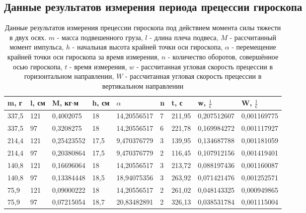\documentclass[12pt]{article}
\begin{document}
\subsection{Данные результатов измерения периода прецессии гироскопа} \label{app_2}
\begin{table}[H]
    \centering
    \begin{tabular}{|l|l|l|l|l|l|l|l|l|}
        \hline
        m, г  & l, см & M, кг$\cdot$м & h, см & $\alpha$    & n & t, с   & w, $\frac{1}{\textrm{с}}$ & W, $\frac{1}{\textrm{с}}$ \\ 
        \hline
        337,5 & 121   & 0,4002075     & 18    & 14,20556517 & 7 & 211,95 & 0,207512607               & 0,001169775               \\
        337,5 & 97    & 0,3208275     & 18    & 14,20556517 & 6 & 221,78 & 0,169984272               & 0,001117927               \\ 
        214,4 & 121   & 0,25423552    & 17,5  & 9,470376779 & 3 & 139,95 & 0,134687788               & 0,001181059               \\
        214,4 & 97    & 0,20380864    & 17,5  & 9,470376779 & 2 & 116,45 & 0,107912156               & 0,001419401               \\ 
        140,8 & 121   & 0,16696064    & 18    & 14,20556517 & 3 & 213,72 & 0,088197436               & 0,001160087               \\ 
        140,8 & 97    & 0,13384448    & 18,5  & 18,94075356 & 3 & 263,92 & 0,071421476               & 0,001252571               \\ 
        75,9  & 121   & 0,09000222    & 18    & 14,20556517 & 2 & 261,02 & 0,048143325               & 0,000949865               \\ 
        75,9  & 97    & 0,07215054    & 18,7  & 20,83482891 & 2 & 326,13 & 0,038531784               & 0,001115004               \\ 
        \hline
    \end{tabular}
    
    \caption{Данные результатов измерения прецессии гироскопа под действием момента силы тяжести в двух осях. $m$ - масса подвешенного груза,
        $l$ - длина плеча подвеса, $M$ - рассчитанный момент импульса, $h$ - начальная высота крайней точки оси гироскопа, $\alpha$ - перемещение 
        крайней точки оси гироскопа за время измерения, $n$ - количество оборотов, совершённое осью гироскопа, $t$ - время измерения, 
        $w$ - рассчитанная угловая скорость прецессии в горизонтальном направлении, $W$ - рассчитанная угловая скорость прецессии в вертикальном направлении}
    \label{tab:1}
\end{table}
\end{document}
